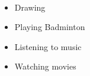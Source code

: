  \\[-0.4cm]
\begin{itemize}
	\item Drawing
	\item Playing Badminton\\[-0.6cm]
	\item Listening to music \\[-0.6cm]
	\item Watching movies \\[-0.6cm]
\end{itemize}
